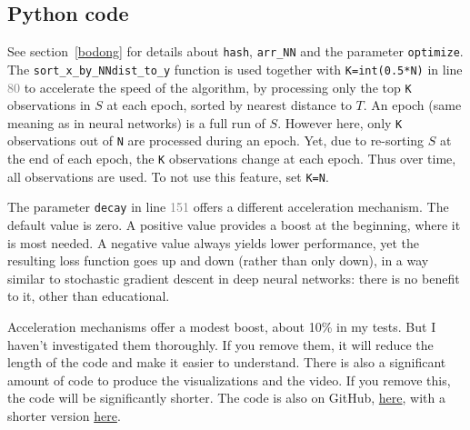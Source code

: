 \documentclass[oneside,10pt]{book}
\begin{document}
 

\subsection{Python code}\label{pyrhic}

See section~\ref{bodong} for details about \texttt{hash}, \texttt{arr\_NN} and the parameter \texttt{optimize}.
The \texttt{sort\_x\_by\_NNdist\_to\_y} function is used together with \texttt{K=int(0.5*N)} 
in line \textcolor{gray}{80} to accelerate the speed of the algorithm, by processing only the top \texttt{K} observations in
 $S$ at each epoch, sorted by nearest distance to $T$. An \textcolor{index}{epoch} (same meaning as in neural networks) is a full run of $S$. However here, only \texttt{K}
 observations out of \texttt{N} are processed during an epoch. Yet, due to re-sorting $S$ at the end of each epoch, the \texttt{K} observations change at each epoch. Thus over time, all observations are used. To not use this feature, set \texttt{K=N}.

The parameter \texttt{decay} in line \textcolor{gray}{151} offers a different acceleration mechanism. The default value is zero. A positive value provides a boost at the beginning, where it is most needed. A negative value always yields lower performance, yet 
 the resulting loss function goes up and down (rather than only down), in a way similar to 
\textcolor{index}{stochastic gradient  descent} in deep neural networks: there is no benefit to it, other than educational. 

Acceleration mechanisms offer a modest boost, about 10\% in my tests. But I haven't investigated them thoroughly. If you remove them, it will reduce the length of the code and make it easier to understand. There is also a significant amount of code to produce the visualizations and the video. If you remove this, the code will be significantly shorter.
The code is also on GitHub, \href{https://github.com/VincentGranville/Statistical-Optimization/blob/main/ann_fast.py}{here}, with a shorter version \href{https://github.com/VincentGranville/Statistical-Optimization/blob/main/ann.py}{here}.  
\vspace{1ex}
\end{document}
